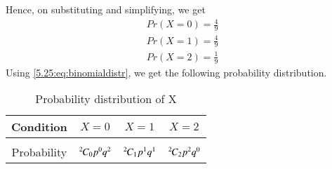 Hence, on substituting and simplifying, we get
\begin{align}
    \tag{5.25.6}
    Pr(X=0)=\frac{4}{9}\\
    \tag{5.25.7}
    Pr(X=1)=\frac{4}{9}\\
    \tag{5.25.8}
    Pr(X=2)=\frac{1}{9}
\end{align}
\newline
Using \eqref{5.25:eq:binomialdistr}, we get the following probability distribution.
\begin{table}[h!]
\centering
\caption{Probability distribution of X}
\label{5.25:table:1}
\begin{tabular}{|c||c|c|c|}
    \hline
    Condition & $X = 0$& $X =1 $& $X=2$ \\
    \hline
    & & &\\
    Probability & ${{}^{2}\mkern-1muC_{0}}p^{0}q^{2}$ & ${{}^{2}\mkern-1muC_{1}}p^{1}q^{1}$ & ${{}^{2}\mkern-1muC_{2}}p^{2}q^{0}$\\[1ex]
    \hline
\end{tabular}
\end{table}